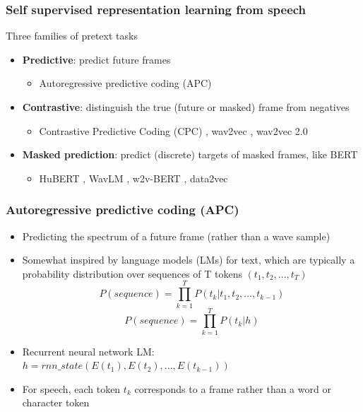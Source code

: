 \documentclass[table]{beamer}
\begin{document}
\begin{frame}
\frametitle{Self supervised representation learning from speech}
Three families of pretext tasks
\begin{itemize}
	\item \textbf{Predictive}: predict future frames
		\begin{itemize}
		\item Autoregressive predictive coding (APC) \citep{DBLP:journals/corr/abs-1904-03240,chung2020improved}
		\end{itemize}
	\item \textbf{Contrastive}: distinguish the true (future or masked) frame from negatives
		\begin{itemize}
		\item Contrastive Predictive Coding (CPC) \citep{CPCfirstref}, wav2vec \citep{DBLP:journals/corr/abs-1904-05862}, wav2vec 2.0 \citep{DBLP:conf/nips/BaevskiZMA20}
		\end{itemize}	
	\item \textbf{Masked prediction}: predict (discrete) targets of masked frames, like BERT
		\begin{itemize}
		\item HuBERT \citep{DBLP:journals/corr/abs-2106-07447}, WavLM \citep{chen2022wavlm}, w2v-BERT \citep{chung2021w2vbert}, data2vec \citep{baevski2022data2vec}
		\end{itemize}
\end{itemize} 
\end{frame}


\begin{frame}
\frametitle{Autoregressive predictive coding (APC)}
\begin{itemize}
\item Predicting the spectrum of a future frame (rather than a wave sample) \citep{DBLP:journals/corr/abs-1904-03240} 
\item Somewhat inspired by language models (LMs) for text, which are typically a probability distribution over sequences of T tokens $(t_1,t_2,...,t_T )$
\begin{equation}
	P(sequence) = \prod_{k=1}^{T} P(t{_{k}}|t{_{1}},t{_{2}},...,t{_{k-1}})
\end{equation}
\begin{equation}
	P(sequence) = \prod_{k=1}^{T} P(t{_{k}}|h)
\end{equation}
\item Recurrent neural network LM: $h=rnn\_state(E(t{_{1}}),E(t{_{2}}),...,E(t{_{k-1}}))$
\item For speech, each token $t_k$ corresponds to a frame rather than a word or character token
\end{itemize} 
\end{frame}
\end{document}
